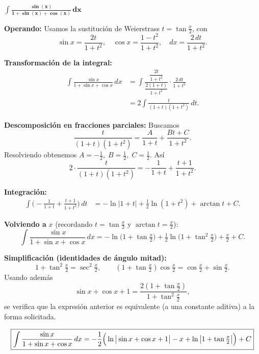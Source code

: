 $\displaystyle \mathbf{\int \frac{\sin(x)}{1+\sin(x)+\cos(x)}\,dx}$

\nopagebreak
\textbf{Operando:}  
Usamos la sustitución de Weierstrass \(t=\tan\frac{x}{2}\), con
\[
\sin x=\frac{2t}{1+t^{2}},\quad \cos x=\frac{1-t^{2}}{1+t^{2}},\quad dx=\frac{2\,dt}{1+t^{2}}.
\]

\nopagebreak
\textbf{Transformación de la integral:}
\[
\begin{aligned}
\int \frac{\sin x}{1+\sin x+\cos x}\,dx
&= \int \frac{\dfrac{2t}{1+t^{2}}}{\dfrac{2(1+t)}{1+t^{2}}}\cdot\frac{2\,dt}{1+t^{2}} \\[6pt]
&= 2\int \frac{t}{(1+t)(1+t^{2})}\,dt.
\end{aligned}
\]

\nopagebreak
\textbf{Descomposición en fracciones parciales:}  
Buscamos
\[
\frac{t}{(1+t)(1+t^{2})}=\frac{A}{1+t}+\frac{Bt+C}{1+t^{2}}.
\]
Resolviendo obtenemos \(A=-\tfrac{1}{2},\; B=\tfrac{1}{2},\; C=\tfrac{1}{2}\). Así
\[
2\cdot\frac{t}{(1+t)(1+t^{2})}
= -\frac{1}{1+t} + \frac{t+1}{1+t^{2}}.
\]

\nopagebreak
\textbf{Integración:}
\[
\begin{aligned}
\int\!\Big(-\frac{1}{1+t}+\frac{t+1}{1+t^{2}}\Big)\,dt
&= -\ln|1+t| + \tfrac{1}{2}\ln(1+t^{2}) + \arctan t + C.
\end{aligned}
\]

\nopagebreak
\textbf{Volviendo a } \(x\) (recordando \(t=\tan\frac{x}{2}\) y \(\arctan t=\tfrac{x}{2}\)):
\[
\int \frac{\sin x}{1+\sin x+\cos x}\,dx
= -\ln\!\big(1+\tan\tfrac{x}{2}\big) + \tfrac{1}{2}\ln\!\big(1+\tan^{2}\tfrac{x}{2}\big) + \tfrac{x}{2} + C.
\]

\nopagebreak
\textbf{Simplificación (identidades de ángulo mitad):}
\[
1+\tan^{2}\!\tfrac{x}{2}=\sec^{2}\!\tfrac{x}{2},\qquad
(1+\tan\tfrac{x}{2})\cos\tfrac{x}{2}=\cos\tfrac{x}{2}+\sin\tfrac{x}{2}.
\]
Usando además
\[
\sin x+\cos x+1=\frac{2(1+\tan\frac{x}{2})}{1+\tan^{2}\frac{x}{2}},
\]
se verifica que la expresión anterior es equivalente (a una constante aditiva) a la forma solicitada.

\nopagebreak
\[
\boxed{%
\displaystyle
\int \frac{\sin x}{1+\sin x+\cos x}\,dx
= -\frac{1}{2}\Big(\ln\big|\sin x+\cos x+1\big|-x+\ln\big|1+\tan\tfrac{x}{2}\big|\Big)+C
}
\]
